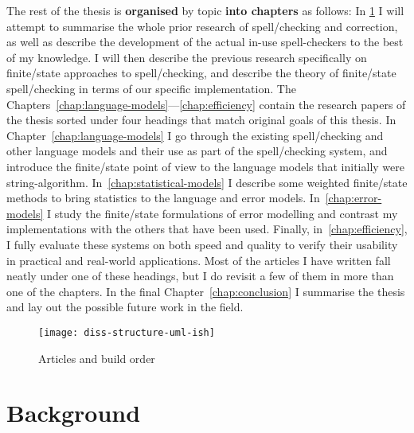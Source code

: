 \documentclass[officiallayout]{unihelcompling}
\begin{document}
The rest of the thesis is \textbf{organised} by topic \textbf{into chapters} as
follows: In \ref{chap:background} I will attempt to summarise the whole prior
research of spell\-/checking and correction, as well as describe the
development of the actual in-use spell-checkers to the best of my knowledge. I
will then describe the previous research specifically on finite\-/state
approaches to spell\-/checking, and describe the theory of finite\-/state
spell\-/checking in terms of our specific implementation. The
Chapters~\ref{chap:language-models}---\ref{chap:efficiency} contain the
research papers of the thesis sorted under four headings that match original
goals of this thesis.  In Chapter~\ref{chap:language-models} I go through the
existing spell\-/checking and other language models and their use as part of
the spell\-/checking system, and introduce the finite\-/state point of view to
the language models that initially were string-algorithm.
In~\ref{chap:statistical-models} I describe some weighted finite\-/state methods
to bring statistics to the language and error models.
In~\ref{chap:error-models} I study the finite\-/state formulations of error
modelling and contrast my implementations with the others that have been used.
Finally, in~\ref{chap:efficiency}, I fully evaluate these systems on both speed
and quality to verify their usability in practical and real-world applications.
Most of the articles I have written fall neatly under one of these headings,
but I do revisit a few of them in more than one of the chapters. In the final
Chapter~\ref{chap:conclusion} I summarise the thesis and lay out the possible
future work in the field.

\begin{figure}
    \texttt{[image: diss-structure-uml-ish]}
    \caption{Articles and build order
    \label{fig:schematic-diagram}}
\end{figure}

\chapter{Background}
\label{chap:background}
\end{document}
